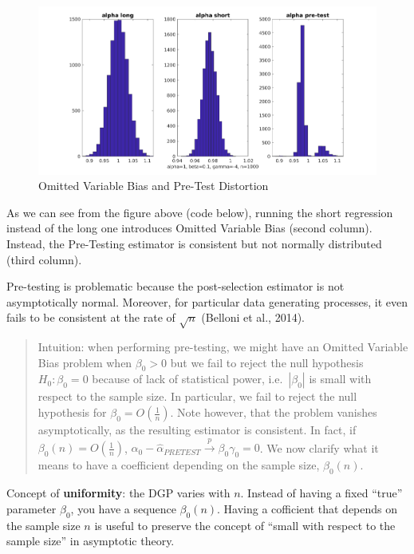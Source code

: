 \documentclass[12pt,]{book}
\begin{document}
\begin{figure}
\centering
\includegraphics{figures/Fig_621.png}
\caption{Omitted Variable Bias and Pre-Test Distortion}
\end{figure}

As we can see from the figure above (code below), running the short regression instead of the long one introduces Omitted Variable Bias (second column). Instead, the Pre-Testing estimator is consistent but not normally distributed (third column).

Pre-testing is problematic because the post-selection estimator is not asymptotically normal. Moreover, for particular data generating processes, it even fails to be consistent at the rate of \(\sqrt{n}\) (Belloni et al., 2014).

\begin{quote}
Intuition: when performing pre-testing, we might have an Omitted Variable Bias problem when \(\beta_0>0\) but we fail to reject the null hypothesis \(H_0:\beta_0=0\) because of lack of statistical power, i.e.~\(|\beta_0|\) is small with respect to the sample size. In particular, we fail to reject the null hypothesis for \(\beta_0 = O\left( \frac{1}{n}\right)\). Note however, that the problem vanishes asymptotically, as the resulting estimator is consistent. In fact, if \(\beta_0(n) = O\left( \frac{1}{n}\right)\), \(\alpha_0 - \hat \alpha_{PRETEST} \overset{p}{\to} \beta_0 \gamma_0 = 0\). We now clarify what it means to have a coefficient depending on the sample size, \(\beta_0(n)\).
\end{quote}

Concept of \textbf{uniformity}: the DGP varies with \(n\). Instead of having a fixed ``true'' parameter \(\beta_0\), you have a sequence \(\beta_0(n)\).
Having a cofficient that depends on the sample size \(n\) is useful to preserve the concept of ``small with respect to the sample size'' in asymptotic theory.
\end{document}
